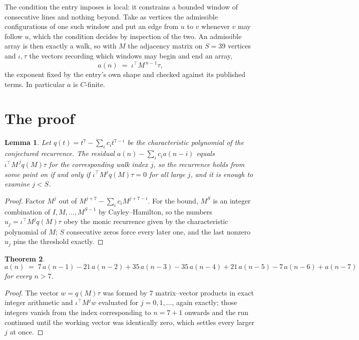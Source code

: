 \documentclass[11pt,a4paper]{article}
\theoremstyle{plain}
\newtheorem{theorem}{Theorem}
\newtheorem{lemma}[theorem]{Lemma}
\theoremstyle{definition}
\begin{document}
The condition the entry imposes is local: it constrains a bounded window of consecutive lines and nothing beyond. Take as
vertices the admissible configurations of one such window and put an edge from $u$ to $v$
whenever $v$ may follow $u$, which the condition decides by inspection of the two. An
admissible array is then exactly a walk, so with $M$ the adjacency matrix on $S=39$ vertices
and $\iota,\tau$ the vectors recording which windows may begin and end an array,
\[
a(n)\;=\;\iota^{\!\top}M^{\,n-1}\tau ,
\]
the exponent fixed by the entry's own shape and checked against its published terms. In
particular $a$ is $C$-finite.

\section{The proof}

\begin{lemma}\label{lem:crit}
Let $q(t)=t^{7}-\sum_i c_it^{7-i}$ be the characteristic polynomial of the
conjectured recurrence. The residual $a(n)-\sum_ic_ia(n-i)$ equals
$\iota^{\!\top}M^{\,j}q(M)\tau$ for the corresponding walk index $j$, so the recurrence
holds from some point on if and only if $\iota^{\!\top}M^{j}q(M)\tau=0$ for all large $j$,
and it is enough to examine $j<S$.
\end{lemma}

\begin{proof}
Factor $M^{j}$ out of $M^{j+7}-\sum_ic_iM^{j+7-i}$. For the bound, $M^{S}$
is an integer combination of $I,M,\dots,M^{S-1}$ by Cayley--Hamilton, so the numbers
$u_j=\iota^{\!\top}M^{j}q(M)\tau$ obey the monic recurrence given by the characteristic
polynomial of $M$; $S$ consecutive zeros force every later one, and the last nonzero $u_j$
pins the threshold exactly.
\end{proof}

\begin{theorem}
\[
a(n)\;=\;7\,a(n-1) - 21\,a(n-2) + 35\,a(n-3) - 35\,a(n-4) + 21\,a(n-5) - 7\,a(n-6) + a(n-7)
\]
for every $n>7$.
\end{theorem}

\begin{proof}
The vector $w=q(M)\tau$ was formed by $7$ matrix--vector products in exact integer
arithmetic and $\iota^{\!\top}M^{j}w$ evaluated for $j=0,1,\dots$, again exactly; those
integers vanish from the index corresponding to $n=7+1$ onwards and the run continued
until the working vector was identically zero, which settles every larger $j$ at once.
\end{proof}
\end{document}
